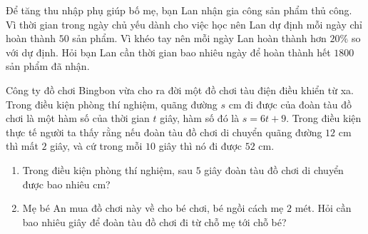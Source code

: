 \begin{bt}%
Để tăng thu nhập phụ giúp bố mẹ, bạn Lan nhận gia công sản phẩm thủ công. Vì thời gian trong ngày chủ yếu dành cho việc học nên Lan dự định mỗi ngày chỉ hoàn thành $50$ sản phẩm. Vì khéo tay nên mỗi ngày Lan hoàn thành hơn $20\%$ so với dự định. Hỏi bạn Lan cần thời gian bao nhiêu ngày để hoàn thành hết $1800$ sản phẩm đã nhận. 	
\end{bt}

\begin{bt}%
	Công ty đồ chơi Bingbon vừa cho ra đời một đồ chơi tàu điện điều khiển từ xa. Trong điều kiện phòng thí nghiệm, quãng đường $s$ cm đi được của đoàn tàu đồ chơi là một hàm số của thời gian $t$ giây, hàm số đó là $s=6t+9.$ Trong điều kiện thực tế người ta thấy rằng nếu đoàn tàu đồ chơi di chuyển quãng đường $12$ cm thì mất $2$ giây, và cứ trong mỗi $10$ giây thì nó đi được $52$ cm. 
	\begin{enumerate}
		\item Trong điều kiện phòng thí nghiệm, sau $5$ giây đoàn tàu đồ chơi di chuyển được bao nhiêu cm? 
		\item Mẹ  bé An mua đồ chơi này về cho bé chơi, bé ngồi cách mẹ $2$ mét. Hỏi cần bao nhiêu giây để đoàn tàu đồ chơi đi từ chỗ  mẹ tới chỗ bé? 
	\end{enumerate}
\end{bt}

